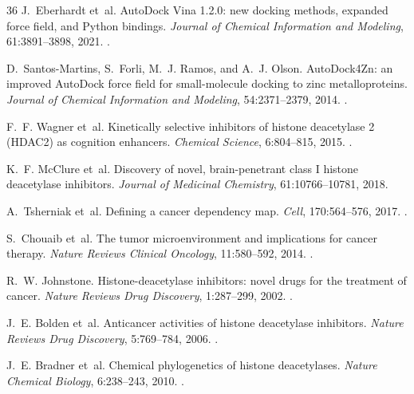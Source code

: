 \begin{thebibliography}{36}
J.~Eberhardt et~al.
\newblock AutoDock Vina 1.2.0: new docking methods, expanded force field, and Python bindings.
\newblock \emph{Journal of Chemical Information and Modeling}, 61:3891--3898, 2021.
\newblock {}.

D.~Santos-Martins, S.~Forli, M.~J. Ramos, and A.~J. Olson.
\newblock AutoDock4Zn: an improved AutoDock force field for small-molecule docking to zinc metalloproteins.
\newblock \emph{Journal of Chemical Information and Modeling}, 54:2371--2379, 2014.
\newblock {}.

F.~F. Wagner et~al.
\newblock Kinetically selective inhibitors of histone deacetylase 2 (HDAC2) as cognition enhancers.
\newblock \emph{Chemical Science}, 6:804--815, 2015.
\newblock {}.

K.~F. McClure et~al.
\newblock Discovery of novel, brain-penetrant class I histone deacetylase inhibitors.
\newblock \emph{Journal of Medicinal Chemistry}, 61:10766--10781, 2018.

A.~Tsherniak et~al.
\newblock Defining a cancer dependency map.
\newblock \emph{Cell}, 170:564--576, 2017.
\newblock {}.

S.~Chouaib et~al.
\newblock The tumor microenvironment and implications for cancer therapy.
\newblock \emph{Nature Reviews Clinical Oncology}, 11:580--592, 2014.
\newblock {}.

R.~W. Johnstone.
\newblock Histone-deacetylase inhibitors: novel drugs for the treatment of cancer.
\newblock \emph{Nature Reviews Drug Discovery}, 1:287--299, 2002.
\newblock {}.

J.~E. Bolden et~al.
\newblock Anticancer activities of histone deacetylase inhibitors.
\newblock \emph{Nature Reviews Drug Discovery}, 5:769--784, 2006.
\newblock {}.

J.~E. Bradner et~al.
\newblock Chemical phylogenetics of histone deacetylases.
\newblock \emph{Nature Chemical Biology}, 6:238--243, 2010.
\newblock {}.

\end{thebibliography}
